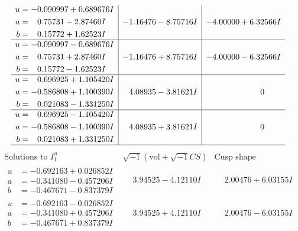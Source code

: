 \documentclass[1p]{elsarticle_modified}
\theoremstyle{definition}
\newcommand{\I}{\sqrt{-1}}
\begin{document}
$$\begin{array}{c|c|c}
\begin{aligned}
u &= -0.090997 + 0.689676 I \\
a &= \phantom{-}0.75731 - 2.87460 I \\
b &= \phantom{-}0.15772 + 1.62523 I\end{aligned}
 & -1.16476 - 8.75716 I & -4.00000 + 6.32566 I \\ \hline\begin{aligned}
u &= -0.090997 - 0.689676 I \\
a &= \phantom{-}0.75731 + 2.87460 I \\
b &= \phantom{-}0.15772 - 1.62523 I\end{aligned}
 & -1.16476 + 8.75716 I & -4.00000 - 6.32566 I \\ \hline\begin{aligned}
u &= \phantom{-}0.696925 + 1.105420 I \\
a &= -0.586808 + 1.100390 I \\
b &= \phantom{-}0.021083 - 1.331250 I\end{aligned}
 & \phantom{-}4.08935 - 3.81621 I & \phantom{-0.000000 } 0 \\ \hline\begin{aligned}
u &= \phantom{-}0.696925 - 1.105420 I \\
a &= -0.586808 - 1.100390 I \\
b &= \phantom{-}0.021083 + 1.331250 I\end{aligned}
 & \phantom{-}4.08935 + 3.81621 I & \phantom{-0.000000 } 0\\
 \hline 
 \end{array}$$\newpage$$\begin{array}{c|c|c}  
\text{Solutions to }I^u_{1}& \I (\text{vol} + \sqrt{-1}CS) & \text{Cusp shape}\\
 \hline 
\begin{aligned}
u &= -0.692163 + 0.026852 I \\
a &= -0.341080 - 0.457206 I \\
b &= -0.467671 - 0.837379 I\end{aligned}
 & \phantom{-}3.94525 - 4.12110 I & \phantom{-}2.00476 + 6.03155 I \\ \hline\begin{aligned}
u &= -0.692163 - 0.026852 I \\
a &= -0.341080 + 0.457206 I \\
b &= -0.467671 + 0.837379 I\end{aligned}
 & \phantom{-}3.94525 + 4.12110 I & \phantom{-}2.00476 - 6.03155 I \\ \hline\begin{aligned}

\end{aligned}
\end{array}$$
\end{document}
